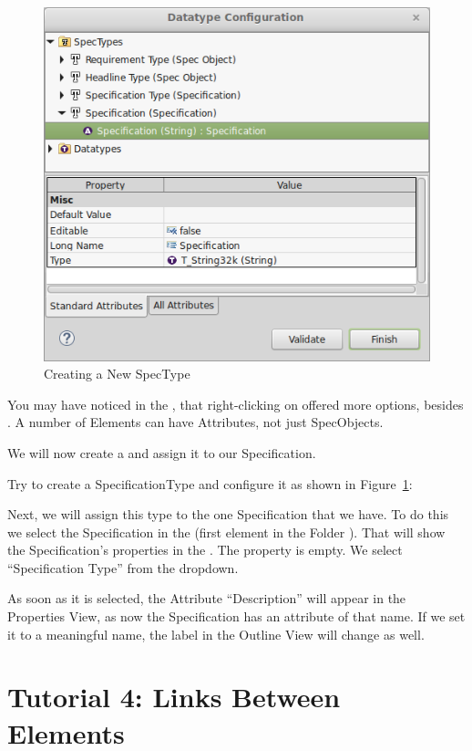 \begin{figure}
\centering      
\includegraphics[width=0.8\linewidth]{../rmf-images/new_spectype.png}      
\caption{Creating a New SpecType}      
\label{fig:newSpecType}
\end{figure}

You may have noticed in the , that right-clicking on  offered more options, besides .  A number of Elements can have Attributes, not just SpecObjects.

We will now create a  and assign it to our Specification.

Try to create a SpecificationType and configure it as shown in Figure~\ref{fig:newSpecType}:

Next, we will assign this type to the one Specification that we have.  To do this we select the Specification in the  (first element in the Folder ).  That will show
the Specification's properties in the .  The  property is empty.  We select ``Specification Type'' from the dropdown.

As soon as it is selected, the Attribute ``Description'' will appear in the Properties View, as now the Specification has an attribute of that name.  If we set it to a meaningful name, the label in the Outline View will change as well.

\section{Tutorial 4: Links Between Elements}
\label{sec:tutorial-links}

